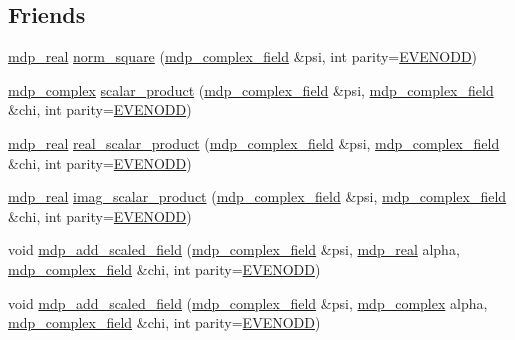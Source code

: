 \subsection*{Friends}
\begin{DoxyCompactItemize}
\item 
\hyperlink{mdp__global__vars_8h_a049e4c1d4e74d644878a42f9909463e4}{mdp\_\-real} \hyperlink{classmdp__complex__field_a81ccdc6212b7084b9fe17249438abe6e}{norm\_\-square} (\hyperlink{classmdp__complex__field}{mdp\_\-complex\_\-field} \&psi, int parity=\hyperlink{mdp__global__vars_8h_a4c9de81f2de5a74b588107b6c0afb9ee}{EVENODD})
\item 
\hyperlink{classmdp__complex}{mdp\_\-complex} \hyperlink{classmdp__complex__field_a7a6ea38341405f2cc4e771b33b4ea38f}{scalar\_\-product} (\hyperlink{classmdp__complex__field}{mdp\_\-complex\_\-field} \&psi, \hyperlink{classmdp__complex__field}{mdp\_\-complex\_\-field} \&chi, int parity=\hyperlink{mdp__global__vars_8h_a4c9de81f2de5a74b588107b6c0afb9ee}{EVENODD})
\item 
\hyperlink{mdp__global__vars_8h_a049e4c1d4e74d644878a42f9909463e4}{mdp\_\-real} \hyperlink{classmdp__complex__field_a0d9771f5d1f057270e5568519a796a0c}{real\_\-scalar\_\-product} (\hyperlink{classmdp__complex__field}{mdp\_\-complex\_\-field} \&psi, \hyperlink{classmdp__complex__field}{mdp\_\-complex\_\-field} \&chi, int parity=\hyperlink{mdp__global__vars_8h_a4c9de81f2de5a74b588107b6c0afb9ee}{EVENODD})
\item 
\hyperlink{mdp__global__vars_8h_a049e4c1d4e74d644878a42f9909463e4}{mdp\_\-real} \hyperlink{classmdp__complex__field_a0671bd0b418f625c07f3ba9135e26b12}{imag\_\-scalar\_\-product} (\hyperlink{classmdp__complex__field}{mdp\_\-complex\_\-field} \&psi, \hyperlink{classmdp__complex__field}{mdp\_\-complex\_\-field} \&chi, int parity=\hyperlink{mdp__global__vars_8h_a4c9de81f2de5a74b588107b6c0afb9ee}{EVENODD})
\item 
void \hyperlink{classmdp__complex__field_adebe165924543c988d0c7e86da4b2eb3}{mdp\_\-add\_\-scaled\_\-field} (\hyperlink{classmdp__complex__field}{mdp\_\-complex\_\-field} \&psi, \hyperlink{mdp__global__vars_8h_a049e4c1d4e74d644878a42f9909463e4}{mdp\_\-real} alpha, \hyperlink{classmdp__complex__field}{mdp\_\-complex\_\-field} \&chi, int parity=\hyperlink{mdp__global__vars_8h_a4c9de81f2de5a74b588107b6c0afb9ee}{EVENODD})
\item 
void \hyperlink{classmdp__complex__field_aeb331a3604fa5d1e30e726958e2cc21f}{mdp\_\-add\_\-scaled\_\-field} (\hyperlink{classmdp__complex__field}{mdp\_\-complex\_\-field} \&psi, \hyperlink{classmdp__complex}{mdp\_\-complex} alpha, \hyperlink{classmdp__complex__field}{mdp\_\-complex\_\-field} \&chi, int parity=\hyperlink{mdp__global__vars_8h_a4c9de81f2de5a74b588107b6c0afb9ee}{EVENODD})

\end{DoxyCompactItemize}
